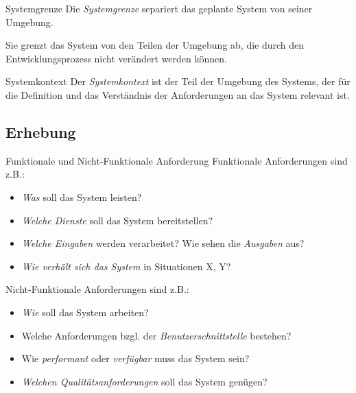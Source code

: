 \begin{defi}{Systemgrenze}
    Die \emph{Systemgrenze} separiert das geplante System von seiner Umgebung.

    Sie grenzt das System von den Teilen der Umgebung ab, die durch den Entwicklungsprozess nicht verändert werden können.
\end{defi}

\begin{defi}{Systemkontext}
    Der \emph{Systemkontext} ist der Teil der Umgebung des Systems, der für die Definition und das Verständnis der Anforderungen an das System relevant ist.
\end{defi}

\subsection{Erhebung}

\begin{defi}{Funktionale und Nicht-Funktionale Anforderung}
    Funktionale Anforderungen sind z.B.:
    \begin{itemize}
        \item \emph{Was} soll das System leisten?
        \item \emph{Welche Dienste} soll das System bereitstellen?
        \item \emph{Welche Eingaben} werden verarbeitet? Wie sehen die \emph{Ausgaben} aus?
        \item \emph{Wie verhält sich das System} in Situationen X, Y?
    \end{itemize}

    Nicht-Funktionale Anforderungen sind z.B.:
    \begin{itemize}
        \item \emph{Wie} soll das System arbeiten?
        \item Welche Anforderungen bzgl. der \emph{Benutzerschnittstelle} bestehen?
        \item Wie \emph{performant} oder \emph{verfügbar} muss das System sein?
        \item \emph{Welchen Qualitätsanforderungen} soll das System genügen?
    \end{itemize}
\end{defi}

